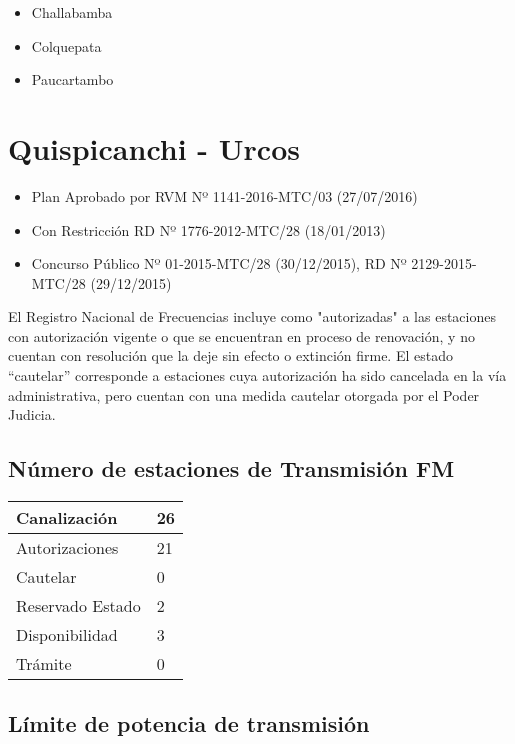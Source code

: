 \documentclass[a4paper]{IEEEtran} %
\begin{document}
\begin{itemize}
	\item Challabamba
	\item Colquepata
	\item Paucartambo
\end{itemize}



\section{Quispicanchi - Urcos}

\begin{itemize}
	\item Plan Aprobado por RVM Nº 1141-2016-MTC/03 (27/07/2016)
	\item Con Restricción RD Nº 1776-2012-MTC/28 (18/01/2013)
	\item Concurso Público Nº 01-2015-MTC/28 (30/12/2015), RD Nº 2129-2015-MTC/28 (29/12/2015)
\end{itemize}

El Registro Nacional de Frecuencias incluye como "autorizadas" a las estaciones con autorización vigente o que se encuentran en proceso de renovación, y no cuentan con resolución que la deje sin efecto o extinción firme. El estado “cautelar” corresponde a estaciones cuya autorización ha sido cancelada en la vía administrativa, pero cuentan con una medida cautelar otorgada por el Poder Judicia.

\subsection{Número de estaciones de Transmisión FM}

\begin{tabular}{|l|l|} \hline
	Canalización 			& 26 \\ \hline
	Autorizaciones			& 21 \\ \hline
	Cautelar				& 0 \\ \hline
	Reservado Estado		& 2 \\ \hline
	Disponibilidad			& 3 \\ \hline
	Trámite					& 0 \\ \hline 
\end{tabular}

\subsection{Límite de potencia de transmisión}
\end{document}
